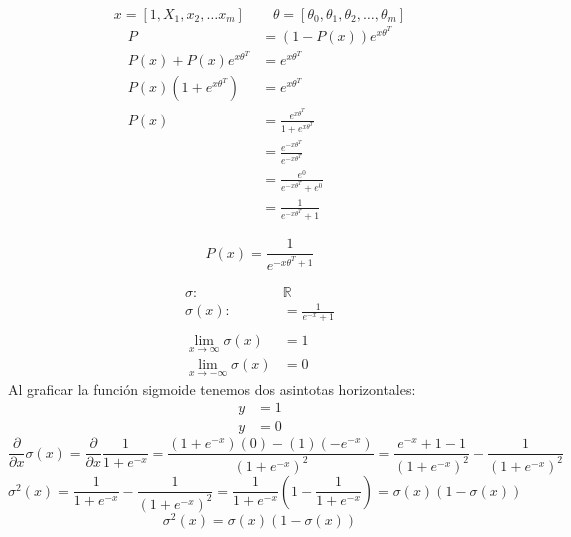 \documentclass{report}
\begin{document}
\[
x=[1, X_1, x_2, \dots x_m]\qquad \theta=[\theta_0, \theta_1, \theta_2, \dots, \theta_m]
\]
\begin{align*}
P&=(1-P(x))e^{x\theta^T}\\
P(x) + P(x)e^{x\theta^T}&=e^{x\theta^T}\\
P(x)(1+e^{x\theta^T})&=e^{x\theta^T}\\
P(x)&=\frac{e^{x\theta^T}}{1+e^{x\theta^T}}\\
&=\frac{e^{-x\theta^T}}{e^{-x\theta^T}}\\
&=\frac{e^0}{e^{-x\theta^T}+e^0}\\
&=\frac{1}{e^{-x\theta^T}+1}
\end{align*}
\begin{center}
	\begin{tcolorbox}[
		colframe = gray, 
		arc = 3mm, 
		width = 0.4\textwidth,
		height = 40pt		
		]
		\[
		P(x)=\frac{1}{e^{-x\theta^T+1}}
		\]
	\end{tcolorbox}
\end{center}
\begin{align*}
\sigma :&\mathbb{R}\\
\sigma(x):&=\frac{1}{e^{-x}+1}\\\\
\lim_{x\rightarrow\infty}\sigma(x)&=1\\
\lim_{x\rightarrow-\infty}\sigma(x)&=0
\end{align*}
Al graficar la función sigmoide tenemos dos asintotas horizontales:
\begin{align*}
y&=1\\
y&=0
\end{align*}
\[
\frac{\partial}{\partial x}\sigma(x)=\frac{\partial}{\partial x}\frac{1}{1+e^{-x}} = \frac{(1+e^{-x})(0) - (1)(-e^{-x})}{(1+e^{-x})^2} = \frac{e^{-x} + 1 - 1}{(1+e^{-x})^2}-\frac{1}{(1+e^{-x})^2}
\]
\[
\sigma^2(x)=\frac{1}{1+e^{-x}}-\frac{1}{(1+e^{-x})^2} = \frac{1}{1+e^{-x}}(1-\frac{1}{1+e^{-x}}) = \sigma(x)(1-\sigma(x))
\]
\[
\sigma^2(x)= \sigma(x)(1-\sigma(x))
\]
\end{document}
